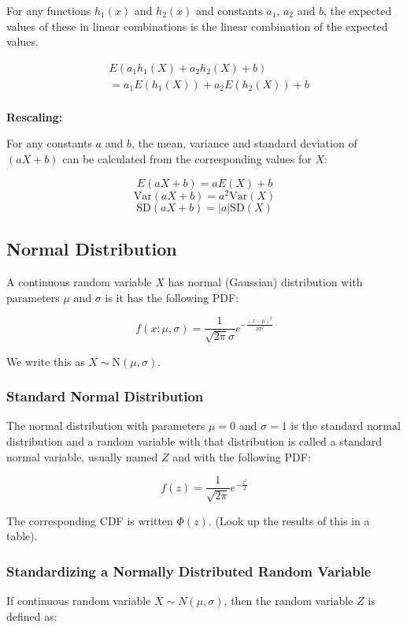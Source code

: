 For any functions $h_1(x)$ and $h_2(x)$ and constants $a_1$, $a_2$ and $b$, the expected values of these in linear combinations is the linear combination of the expected values.

\begin{align*}
     & E(a_1h_1(X) + a_2h_2(X) + b)      \\
     & = a_1E(h_1(X)) + a_2E(h_2(X)) + b \\
\end{align*}

\textbf{Rescaling:}

For any constants $a$ and $b$, the mean, variance and standard deviation of $(aX+b)$ can be calculated from the corresponding values for $X$:

$$ E(aX+b) = aE(X) + b $$
$$ \text{Var}(aX+b) = a^2\text{Var}(X) $$
$$ \text{SD}(aX+b) = |a|\text{SD}(X) $$

\subsection{Normal Distribution}

A continuous random variable $X$ has normal (Gaussian) distribution with parameters $\mu$ and $\sigma$ is it has the following PDF:

$$ f(x; \mu,\sigma) = \frac{1}{\sqrt{2\pi}\sigma} e^{-\frac{(x-\mu)^2}{2\sigma^2}} $$

We write this as $X \sim \text{N}(\mu,\sigma)$.

\subsubsection{Standard Normal Distribution}

The normal distribution with parameters $\mu = 0$ and $\sigma = 1$ is the standard normal distribution and a random variable with that distribution is called a standard normal variable, usually named $Z$ and with the following PDF:

$$ f(z) = \frac{1}{\sqrt{2\pi}} e^{-\frac{z^2}{2}} $$

The corresponding CDF is written $\Phi(z)$. (Look up the results of this in a table).

\subsubsection{Standardizing a Normally Distributed Random Variable}

If continuous random variable $X \sim N(\mu, \sigma)$, then the random variable $Z$ is defined as:

